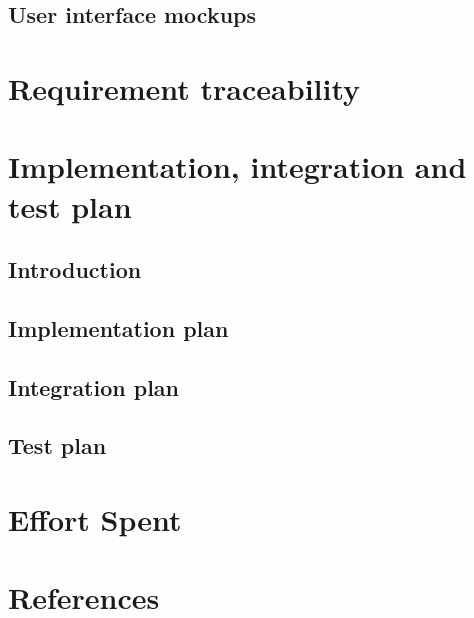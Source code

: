 	\section{User interface mockups}
		
\newpage
\chapter{Requirement traceability}
	
\chapter{Implementation, integration and test plan}
	\section{Introduction}
		
	\section{Implementation plan}
		
	\section{Integration plan}
		
	\section{Test plan}
		
\chapter{Effort Spent}
    
\chapter{References}
	


